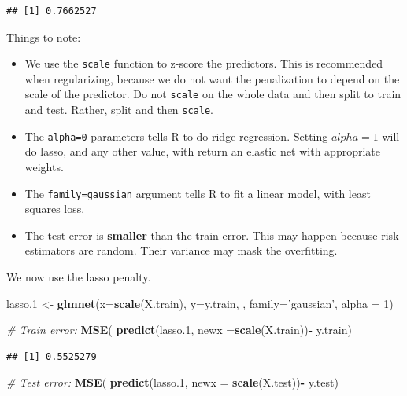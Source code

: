 \documentclass[]{book}
\newenvironment{Shaded}{\begin{snugshade}}{\end{snugshade}}
\newcommand{\KeywordTok}[1]{\textcolor[rgb]{0.13,0.29,0.53}{\textbf{#1}}}
\newcommand{\DataTypeTok}[1]{\textcolor[rgb]{0.13,0.29,0.53}{#1}}
\newcommand{\DecValTok}[1]{\textcolor[rgb]{0.00,0.00,0.81}{#1}}
\newcommand{\StringTok}[1]{\textcolor[rgb]{0.31,0.60,0.02}{#1}}
\newcommand{\CommentTok}[1]{\textcolor[rgb]{0.56,0.35,0.01}{\textit{#1}}}
\newcommand{\OperatorTok}[1]{\textcolor[rgb]{0.81,0.36,0.00}{\textbf{#1}}}
\newcommand{\NormalTok}[1]{#1}
\providecommand{\tightlist}{%
  \setlength{\itemsep}{0pt}\setlength{\parskip}{0pt}}
\theoremstyle{definition}
\theoremstyle{definition}
\theoremstyle{definition}
\theoremstyle{remark}
\begin{document}
\begin{verbatim}
## [1] 0.7662527
\end{verbatim}

Things to note:

\begin{itemize}
\tightlist
\item
  We use the \texttt{scale} function to z-score the predictors. This is
  recommended when regularizing, because we do not want the penalization
  to depend on the scale of the predictor. Do not \texttt{scale} on the
  whole data and then split to train and test. Rather, split and then
  \texttt{scale}.
\item
  The \texttt{alpha=0} parameters tells R to do ridge regression.
  Setting \(alpha=1\) will do lasso, and any other value, with return an
  elastic net with appropriate weights.
\item
  The \texttt{family=\textquotesingle{}gaussian\textquotesingle{}}
  argument tells R to fit a linear model, with least squares loss.
\item
  The test error is \textbf{smaller} than the train error. This may
  happen because risk estimators are random. Their variance may mask the
  overfitting.
\end{itemize}

We now use the lasso penalty.

\begin{Shaded}
\begin{Highlighting}[]
\NormalTok{lasso.}\DecValTok{1}\NormalTok{ <-}\StringTok{ }\KeywordTok{glmnet}\NormalTok{(}\DataTypeTok{x=}\KeywordTok{scale}\NormalTok{(X.train), }\DataTypeTok{y=}\NormalTok{y.train, , }\DataTypeTok{family=}\StringTok{'gaussian'}\NormalTok{, }\DataTypeTok{alpha =} \DecValTok{1}\NormalTok{)}

\CommentTok{# Train error:}
\KeywordTok{MSE}\NormalTok{( }\KeywordTok{predict}\NormalTok{(lasso.}\DecValTok{1}\NormalTok{, }\DataTypeTok{newx =}\KeywordTok{scale}\NormalTok{(X.train))}\OperatorTok{-}\StringTok{ }\NormalTok{y.train)}
\end{Highlighting}
\end{Shaded}

\begin{verbatim}
## [1] 0.5525279
\end{verbatim}

\begin{Shaded}
\begin{Highlighting}[]
\CommentTok{# Test error:}
\KeywordTok{MSE}\NormalTok{( }\KeywordTok{predict}\NormalTok{(lasso.}\DecValTok{1}\NormalTok{, }\DataTypeTok{newx =} \KeywordTok{scale}\NormalTok{(X.test))}\OperatorTok{-}\StringTok{ }\NormalTok{y.test)}
\end{Highlighting}
\end{Shaded}
\end{document}

